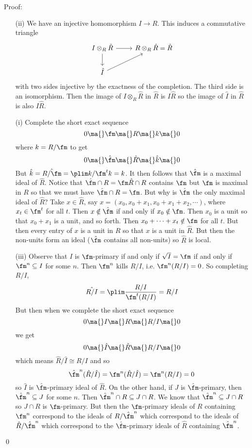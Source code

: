 \noindent Proof: 
\begin{enumerate}
\item[(ii)] We have an injective homomorphism $I \to R$. This induces a commutative triangle
\[
\begin{tikzcd}
I \otimes_R \hat{R} \arrow{r} \arrow{d} & R \otimes_R \hat{R}=\hat{R} \\
\hat{I} \arrow{ur} & 
\end{tikzcd}
\]
with two sides injective by the exactness of the completion. The third side is an isomorphism. Then the image of $I \otimes_R \hat{R}$ in $\hat{R}$ is $I \hat{R}$ so the image of $\hat{I}$ in $\hat{R}$ is also $I \hat{R}$. 

\item[(i)] Complete the short exact sequence 
\[
0 \ma{} \fm \ma{} R \ma{} k \ma{} 0
\]
where $k=R/\fm$ to get 
\[
0 \ma{} \hat{\fm} \ma{} \hat{R} \ma{} \hat{k} \ma{} 0
\]
But $\hat{k}=\hat{R/\fm}=\plim k/\fm^t k=k$. It then follows that $\hat{\fm}$ is a maximal ideal of $\hat{R}$. Notice that $\hat{\fm} \cap R=\fm \hat{R} \cap R$ contains $\fm$ but $\fm$ is maximal in $R$ so that we must have $\hat{\fm} \cap R=\fm$. But why is $\hat{\fm}$ the only maximal ideal of $\hat{R}$? Take $x \in \hat{R}$, say $x=(x_0,x_0+x_1,x_0+x_1+x_2,\cdots)$, where $x_t \in \fm^t$ for all $t$. Then $x \notin \hat{\fm}$ if and only if $x_0 \notin \fm$. Then $x_0$ is a unit so that $x_0+x_1$ is a unit, and so forth. Then $x_0+\cdots+x_t \notin \fm$ for all $t$. But then every entry of $x$ is a unit in $R$ so that $x$ is a unit in $\hat{R}$. But then the non-units form an ideal ($\hat{\fm}$ contains all non-units) so $\hat{R}$ is local. 

\item[(iii)] Observe that $I$ is $\fm$-primary if and only if $\sqrt{I}=\fm$ if and only if $\fm^n \subseteq I$ for some $n$. Then $\fm^n$ kills $R/I$, i.e. $\fm^n(R/I)=0$. So completing $R/I$,
\[
\hat{R/I}= \plim \frac{R/I}{\fm^t(R/I)}=R/I
\]
But then when we complete the short exact sequence
\[
0 \ma{} I \ma{} R \ma{} R/I \ma{} 0
\]
we get
\[
0 \ma{} \hat{I} \ma{} \hat{R} \ma{} R/I \ma{} 0
\]
which means $\hat{R}/\hat{I} \cong R/I$ and so 
\[
\hat{\fm}^n(\hat{R}/\hat{I})=\fm^n(\hat{R}/\hat{I})=\fm^n(R/I)=0
\]
so $\hat{I}$ is $\hat{\fm}$-primary ideal of $\hat{R}$. On the other hand, if $J$ is $\hat{\fm}$-primary, then $\hat{\fm}^n \subseteq J$ for some $n$. Then $\hat{\fm}^n \cap R \subseteq J \cap R$. We know that $\hat{\fm}^n \subseteq J \cap R$ so $J \cap R$ is $\fm$-primary. But then the $\fm$-primary ideals of $R$ containing $\fm^n$ correspond to the ideals of $R/\hat{\fm}^n$ which correspond to the ideals of $\hat{R}/\hat{\fm}^n$ which correspond to the $\hat{\fm}$-primary ideals of $\hat{R}$ containing $\hat{\fm}^n$. 
\end{enumerate}
\qed \\

